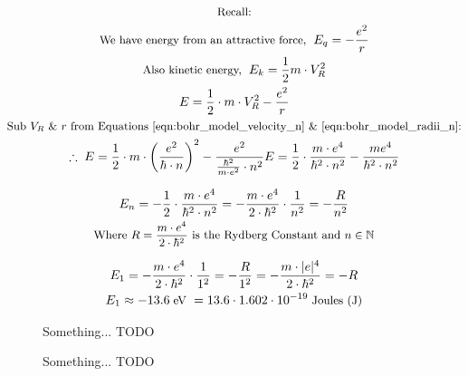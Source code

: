 \documentclass[../../Quantum-Technologies-Notes]{subfiles}
\begin{document}
			
			\begin{gather*}
					\text{\small Recall:} \\
					\text{\small We have energy from an attractive force, } \; E_q = - \frac{e^2}{r} \\
					\text{\small Also kinetic energy, } \; E_k = \frac{1}{2} m \cdot V_R^2 \\
					E = \frac{1}{2} \cdot m \cdot V_R^2 - \frac{e^2}{r} \\
					\text{\small Sub $V_R$ \& $r$ from Equations \ref{eqn:bohr_model_velocity_n} \& \ref{eqn:bohr_model_radii_n}:} \\
					\therefore \; E = \frac{1}{2} \cdot m \cdot \left(\frac{e^2}{\hbar \cdot n}\right)^2 - \frac{e^2}{\frac{\hbar^2}{m \cdot e^2} \cdot n^2}
					E = \frac{1}{2} \cdot \frac{m \cdot e^4}{\hbar^2 \cdot n^2} - \frac{m e^4}{\hbar^2 \cdot n^2}
				\end{gather*}
			
			\begin{gather} \label{eqn:bohr_model_energy_n}
					E_n = - \frac{1}{2} \cdot \frac{m \cdot e^4}{\hbar^2 \cdot n^2} = - \frac{m \cdot e^4}{2 \cdot \hbar^2} \cdot \frac{1}{n^2} = - \frac{R}{n^2} \\ 
					\text{\small Where $R=\frac{m \cdot e^4}{2 \cdot \hbar^2}$ is the Rydberg Constant and $n \in \mathbb{N}$} \nonumber
				\end{gather}
			
			\begin{gather}
					E_1 = - \frac{m \cdot e^4}{2 \cdot \hbar^2} \cdot \frac{1}{1^2} = - \frac{R}{1^2} = - \frac{m \cdot |e|^4}{2 \cdot \hbar^2} = -R \nonumber\\
					\label{eqn:bohr_model_energy_1} E_1 \approx -13.6 \; \text{\small eV } = 13.6 \cdot 1.602 \cdot 10^{-19} \; \text{\small Joules (J)}
				\end{gather}
			
			
			
			
			\begin{figure}[!h]
					\centering
					
				\caption{Something... TODO } %
				\label{fig:bohr_model_energy_levels}
				\end{figure}
			
			
			
			\begin{figure}[!h]
					\centering
					
				\caption{Something... TODO } %
				\label{fig:bohr_model_energy_transitions}
				\end{figure}
			
			
			\pagebreak
\end{document}
